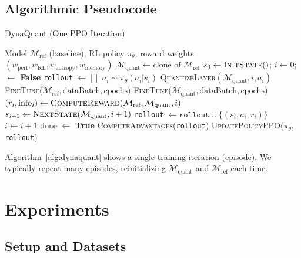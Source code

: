 \documentclass{article}
\begin{document}
	\vspace{-0.75em}
	\subsection{Algorithmic Pseudocode}
	\label{subsec:pseudocode}
	\vspace{-0.25em}
	
	\begin{algorithm}[h]
		\footnotesize
		\caption{DynaQuant (One PPO Iteration)}
		\label{alg:dynaquant}
		\begin{algorithmic}[1]
			\REQUIRE Model $\mathcal{M}_\text{ref}$ (baseline), RL policy $\pi_\theta$, reward weights $(w_{\mathrm{perf}}, w_{\mathrm{KL}}, w_{\mathrm{entropy}}, w_{\mathrm{memory}})$
			\STATE $\mathcal{M}_\text{quant} \leftarrow \text{clone of } \mathcal{M}_\text{ref}$
			\STATE $s_0 \leftarrow \textsc{InitState}()$; $i \leftarrow 0$;  $\leftarrow$ \textbf{False}
			\STATE \texttt{rollout} $\leftarrow []$
			\STATE $a_i \sim \pi_\theta(a_i|s_i)$
			\STATE \textsc{QuantizeLayer}$(\mathcal{M}_\text{quant}, i, a_i)$
			\STATE \textsc{FineTune}($\mathcal{M}_\text{ref}, \text{dataBatch}, \text{epochs})$
			\STATE \textsc{FineTune}($\mathcal{M}_\text{quant}, \text{dataBatch}, \text{epochs})$
			\STATE $(r_i, \text{info}_i) \leftarrow \textsc{ComputeReward}(\mathcal{M}_\text{ref}, \mathcal{M}_\text{quant}, i)$
			\STATE $s_{i+1} \leftarrow \textsc{NextState}(\mathcal{M}_\text{quant}, i+1)$
			\STATE \texttt{rollout} $\leftarrow \texttt{rollout}\cup \{(s_i,a_i,r_i)\}$
			\STATE $i \leftarrow i+1$
			\STATE done $\leftarrow$ \textbf{True}
			\ENDIF
			\ENDWHILE
			\STATE \textsc{ComputeAdvantages}(\texttt{rollout})
			\STATE \textsc{UpdatePolicyPPO}($\pi_\theta$, \texttt{rollout})
		\end{algorithmic}
	\end{algorithm}
	
	Algorithm~\ref{alg:dynaquant} shows a single training iteration (episode). We typically repeat many episodes, reinitializing $\mathcal{M}_\text{quant}$ and $\mathcal{M}_\text{ref}$ each time.
	
	\section{Experiments}
	\label{sec:experiments}
	
	\subsection{Setup and Datasets}
	
\end{document}
